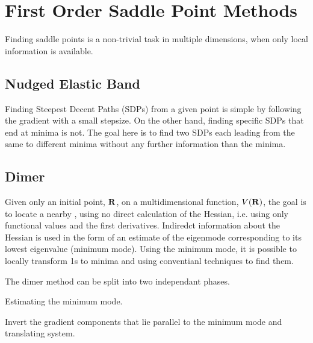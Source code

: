 \section{First Order Saddle Point Methods}
\label{sec:sps}

Finding saddle points is a non-trivial task in multiple dimensions, when only local information is available.

\incomplete

\subsection{Nudged Elastic Band}
\label{sec:neb}

Finding Steepest Decent Paths (SDPs) from a given point is simple by following the gradient with a small stepsize.
On the other hand, finding specific SDPs that end at minima is not.
The goal here is to find two SDPs each leading from the same  to different minima without any further information than the minima.


\incomplete

\subsection{Dimer}
\label{sec:dimer}

Given only an initial point, ${\mathrm{\mathbf{\bm{R}}}}$, on a multidimensional function, $V({\mathrm{\mathbf{\bm{R}}}})$, the goal is to locate a nearby , using no direct calculation of the Hessian, i.e. using only functional values and the first derivatives.
Indiredct information about the Hessian is used in the form of an estimate of the eigenmode corresponding to its lowest eigenvalue (minimum mode).
Using the minimum mode, it is possible to locally transform \sap1s to minima and using conventianl techniques to find them.

The dimer method can be split into two independant phases.
\item Estimating the minimum mode.
\item Invert the gradient components that lie parallel to the minimum mode and translating system.
\een

\incomplete
